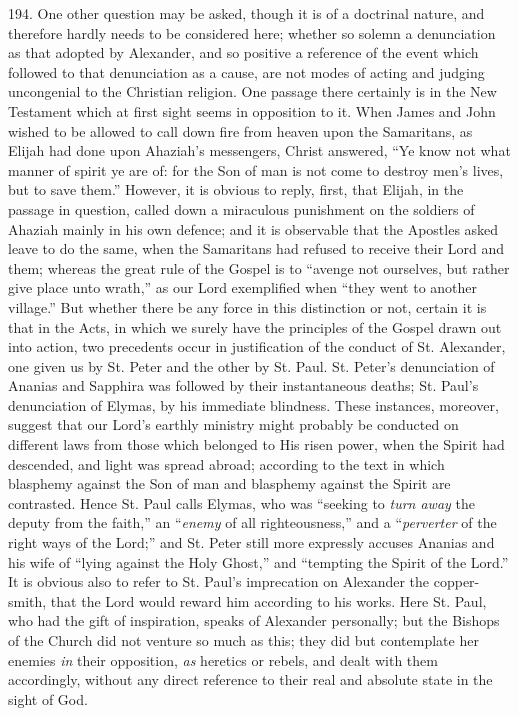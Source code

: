 194.
One other question may be asked, though it is of a doctrinal nature,
and therefore hardly needs to be considered here; whether so solemn a
denunciation as that adopted by Alexander, and so positive a reference
of the event which followed to that denunciation as a cause, are not
modes of acting and judging uncongenial to the Christian religion. One
passage there certainly is in the New Testament which at first sight
seems in opposition to it. When James and John wished to be allowed to
call down fire from heaven upon the Samaritans, as Elijah had done
upon Ahaziah's messengers, Christ answered, ``Ye know not what manner
of spirit ye are of: for the Son of man is not come to destroy men's
lives, but to save them.'' However, it is obvious to reply, first, that
Elijah, in the passage in question, called down a miraculous
punishment on the soldiers of Ahaziah mainly in his own defence; and
it is observable that the Apostles asked leave to do the same, when
the Samaritans had refused to receive their Lord and them; whereas the
great rule of the Gospel is to ``avenge not ourselves, but rather give
place unto wrath,'' as our Lord exemplified when ``they went to another
village.'' But whether there be any force in this distinction or not,
certain it is that in the Acts, in which we surely have the principles
of the Gospel drawn out into action, two precedents occur in
justification of the conduct of St. Alexander, one given us by St.
Peter and the other by St. Paul. St. Peter's denunciation of
Ananias and Sapphira was followed by their instantaneous deaths; St.
Paul's denunciation of Elymas, by his immediate blindness. These
instances, moreover, suggest that our Lord's earthly ministry might
probably be conducted on different laws from those which belonged to
His risen power, when the Spirit had descended, and light was spread
abroad; according to the text in which blasphemy against the Son of
man and blasphemy against the Spirit are contrasted. Hence St. Paul
calls Elymas, who was ``seeking to \emph{turn away} the deputy
from the faith,'' an ``\emph{enemy} of all righteousness,'' and a ``\emph{perverter}
of the right ways of the Lord;'' and St. Peter still more expressly
accuses Ananias and his wife of ``lying against the Holy Ghost,'' and ``tempting
the Spirit of the Lord.'' It is obvious also to refer to St. Paul's
imprecation on Alexander the copper-smith, that the Lord would reward
him according to his works. Here St. Paul, who had the gift of
inspiration, speaks of Alexander personally; but the Bishops of the
Church did not venture so much as this; they did but contemplate her
enemies \emph{in} their opposition, \emph{as} heretics or rebels, and dealt with
them accordingly, without any direct reference to their real and
absolute state in the sight of God.

